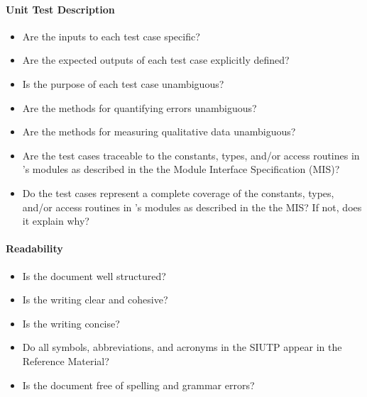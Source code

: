 \paragraph{Unit Test Description}
\begin{itemize}

    \item Are the inputs to each test case specific?

    \item Are the expected outputs of each test case explicitly defined?

    \item Is the purpose of each test case unambiguous?

    \item Are the methods for quantifying errors unambiguous?

    \item Are the methods for measuring qualitative data unambiguous?

    \item Are the test cases traceable to the constants, types, and/or access
    routines in \progname{}'s modules as described in the the Module Interface
    Specification (MIS)?

    \item Do the test cases represent a complete coverage of the constants,
    types, and/or access routines in \progname{}'s modules as described in the
    the MIS? If not, does it explain why?

\end{itemize}

\paragraph{Readability}
\begin{itemize}

    \item Is the document well structured?

    \item Is the writing clear and cohesive?

    \item Is the writing concise?

    \item Do all symbols, abbreviations, and acronyms in the SIUTP appear in
    the Reference Material?

    \item Is the document free of spelling and grammar errors?

\end{itemize}